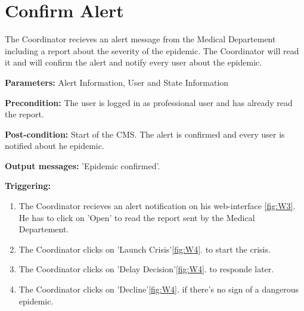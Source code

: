 \section{Confirm Alert}
\label{operation:ConfirmAlert}
The Coordinator recieves an alert message from the Medical Departement
including a report about the severity of the epidemic. The Coordinator will
read it and will confirm the alert and notify every user about the epidemic.\\
\begin{description}
\item \textbf{Parameters:} Alert Information, User and State Information
\item \textbf{Precondition:} The user is logged in as professional user and
has already read the report.
\item \textbf{Post-condition:} Start of the CMS. The alert is confirmed and
every user is notified about he epidemic.
\item \textbf{Output messages:} 'Epidemic confirmed'.
\item \textbf{Triggering:}
\begin{enumerate}
\item The Coordinator recieves an alert notification on his web-interface
\ref{fig:W3}. He has to click on 'Open' to read the report sent by the Medical
Departement.
\item The Coordinator clicks on 'Launch Crisis'\ref{fig:W4}. to start the
crisis.
\item The Coordinator clicks on 'Delay Decision'\ref{fig:W4}. to responde
later.
\item The Coordinator clicks on 'Decline'\ref{fig:W4}. if there's no sign of a
dangerous epidemic.
\end{enumerate}
\end{description}

